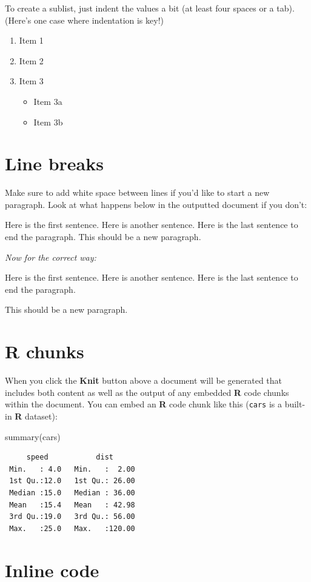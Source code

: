 \documentclass [11pt, proquest] {uwthesis}[2015/03/03]
\newenvironment{Shaded}{\begin{snugshade}}{\end{snugshade}}
\newcommand{\FunctionTok}[1]{\textcolor[rgb]{0.00,0.00,0.00}{#1}}
\newcommand{\NormalTok}[1]{#1}
\providecommand{\tightlist}{%
  \setlength{\itemsep}{0pt}\setlength{\parskip}{0pt}}
\begin{document}
To create a sublist, just indent the values a bit (at least four spaces or a tab). (Here's one case where indentation is key!)
\begin{enumerate}
\def\labelenumi{\arabic{enumi}.}
\tightlist
\item
  Item 1
\item
  Item 2
\item
  Item 3
  \begin{itemize}
  \tightlist
  \item
    Item 3a
  \item
    Item 3b
  \end{itemize}
\end{enumerate}
\hypertarget{line-breaks}{%
\section{Line breaks}\label{line-breaks}}

Make sure to add white space between lines if you'd like to start a new paragraph. Look at what happens below in the outputted document if you don't:

Here is the first sentence. Here is another sentence. Here is the last sentence to end the paragraph.
This should be a new paragraph.

\emph{Now for the correct way:}

Here is the first sentence. Here is another sentence. Here is the last sentence to end the paragraph.

This should be a new paragraph.

\hypertarget{r-chunks}{%
\section{R chunks}\label{r-chunks}}

When you click the \textbf{Knit} button above a document will be generated that includes both content as well as the output of any embedded \textbf{R} code chunks within the document. You can embed an \textbf{R} code chunk like this (\texttt{cars} is a built-in \textbf{R} dataset):
\begin{Shaded}
\begin{Highlighting}[]
\FunctionTok{summary}\NormalTok{(cars)}
\end{Highlighting}
\end{Shaded}
\begin{verbatim}
     speed           dist       
 Min.   : 4.0   Min.   :  2.00  
 1st Qu.:12.0   1st Qu.: 26.00  
 Median :15.0   Median : 36.00  
 Mean   :15.4   Mean   : 42.98  
 3rd Qu.:19.0   3rd Qu.: 56.00  
 Max.   :25.0   Max.   :120.00  
\end{verbatim}
\hypertarget{inline-code}{%
\section{Inline code}\label{inline-code}}
\end{document}
